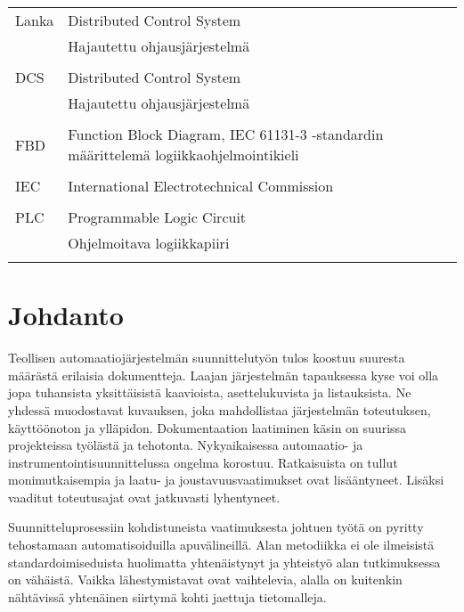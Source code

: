 \documentclass[finnish,12pt]{article}
\begin{document}
	\begin{tabular}{ll}
Lanka        & Distributed Control System \\
	     	      & Hajautettu ohjausjärjestelmä \\ \\
	     	    
DCS        & Distributed Control System \\
        &   Hajautettu ohjausjärjestelmä \\ \\
        
FBD         & Function Block Diagram, IEC 61131-3 -standardin määrittelemä logiikkaohjelmointikieli\\\\
IEC          & International Electrotechnical Commission\\\\
PLC         & Programmable Logic Circuit \\
	      & Ohjelmoitava logiikkapiiri\\\\

	\end{tabular}

	\cleardoublepage
	\storeinipagenumber
	\setcounter{page}{1}


	\section{Johdanto}
	\thispagestyle{empty}

Teollisen automaatiojärjestelmän suunnittelutyön tulos koostuu suuresta määrästä erilaisia dokumentteja.
Laajan järjestelmän tapauksessa kyse voi olla jopa tuhansista yksittäisistä kaavioista, asettelukuvista ja listauksista.
Ne yhdessä muodostavat kuvauksen, joka mahdollistaa järjestelmän toteutuksen, käyttöönoton ja ylläpidon.
Dokumentaation laatiminen käsin on suurissa projekteissa työlästä ja tehotonta.
Nykyaikaisessa automaatio- ja instrumentointisuunnittelussa ongelma korostuu.
Ratkaisuista on tullut monimutkaisempia ja laatu- ja joustavuusvaatimukset ovat lisääntyneet.
Lisäksi vaaditut toteutusajat ovat jatkuvasti lyhentyneet.
\cite{RefWorks:41}

Suunnitteluprosessiin kohdistuneista vaatimuksesta johtuen työtä on pyritty tehostamaan automatisoiduilla apuvälineillä.
Alan metodiikka ei ole ilmeisistä standardoimiseduista huolimatta yhtenäistynyt ja yhteistyö alan tutkimuksessa on vähäistä.
Vaikka lähestymistavat ovat vaihtelevia, alalla on kuitenkin nähtävissä yhtenäinen siirtymä kohti jaettuja tietomalleja.
\end{document}
